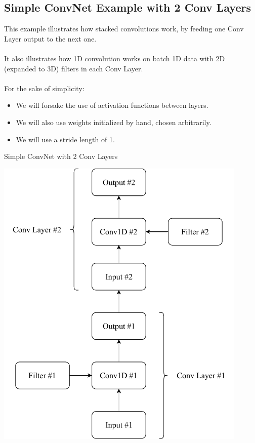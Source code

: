 \documentclass[a4paper, 12pt]{report}
\begin{document}
\subsection{\textbf{Simple ConvNet Example with 2 Conv Layers}}
This example illustrates how stacked convolutions work, by feeding one Conv Layer output to the next one.\\\\
It also illustrates how 1D convolution works on batch 1D data with 2D (expanded to 3D) filters in each Conv Layer.\\\\
For the sake of simplicity:
\begin{itemize}
	\item We will forsake the use of activation functions between layers.
	\item We will also use weights initialized by hand, chosen arbitrarily.
	\item We will use a stride length of 1.
\end{itemize}
\begin{blockfigure}{Simple ConvNet with 2 Conv Layers}
	\begin{center}
		\includegraphics[width=0.9\textwidth]{convLayerExample}
	\end{center}
\end{blockfigure}
\end{document}
